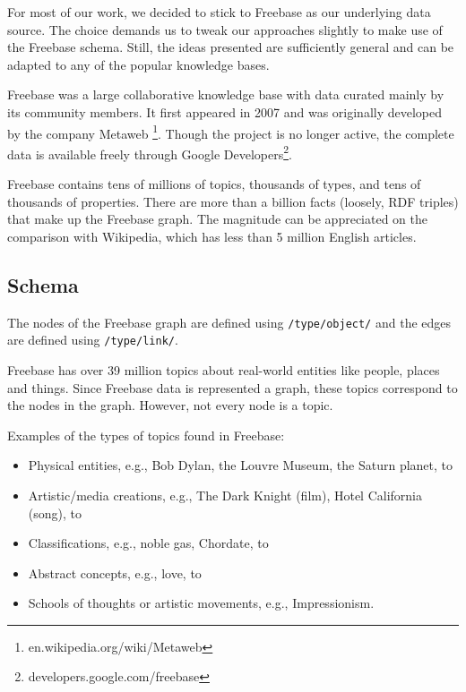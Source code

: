 \documentclass[a4paper, twoside, 12pt]{report}
\begin{document}
For most of our work, we decided to stick to Freebase as our underlying data source. The choice demands us to tweak our approaches slightly to make use of the Freebase schema. Still, the ideas presented are sufficiently general and can be adapted to any of the popular knowledge bases.

Freebase was a large collaborative knowledge base with data curated mainly by its community members. It first appeared in 2007 and was originally developed by the company Metaweb \footnote{en.wikipedia.org/wiki/Metaweb}. Though the project is no longer active, the complete data is available freely through Google Developers\footnote{developers.google.com/freebase}.

Freebase contains tens of millions of topics, thousands of types, and tens of thousands of properties. There are more than a billion facts (loosely, RDF triples) that make up the Freebase graph. The magnitude can be appreciated on the comparison with Wikipedia, which has less than 5 million English articles.

\subsection{Schema}

The nodes of the Freebase graph are defined using \texttt{/type/object/} and the edges are defined using \texttt{/type/link/}.

Freebase has over 39 million topics about real-world entities like people, places and things. Since Freebase data is represented a graph, these topics correspond to the nodes in the graph. However, not every node is a topic.

Examples of the types of topics found in Freebase:
\begin{itemize}
  \item Physical entities, e.g., Bob Dylan, the Louvre Museum, the Saturn planet, to
  \item Artistic/media creations, e.g., The Dark Knight (film), Hotel California (song), to
  \item Classifications, e.g., noble gas, Chordate, to
  \item Abstract concepts, e.g., love, to
  \item Schools of thoughts or artistic movements, e.g., Impressionism.
\end{itemize}
\end{document}
